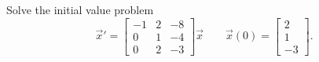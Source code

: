 \documentclass{ximera}
\begin{document}
\begin{exercise}
    Solve the initial value problem
    \[ 
        {\vec{x}}' = 
        \begin{bmatrix}
            -1 & 2 & -8 \\ 
            0 & 1 & -4 \\ 
            0 & 2 & -3 
        \end{bmatrix} 
        \vec{x} \qquad \vec{x}(0) = 
        \begin{bmatrix} 
            2 \\ 
            1 \\ 
            -3 
        \end{bmatrix}. 
    \]
\end{exercise}
\end{document}
